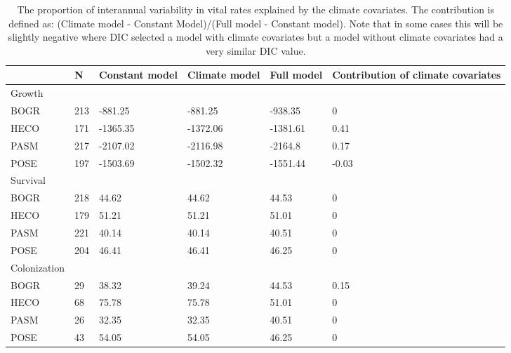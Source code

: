 \documentclass[12pt]{article}
\begin{document}
\begin{table}[ht]
\centering
\caption{The proportion of interannual variability in  vital rates explained by the climate covariates. The contribution is defined as: (Climate model - Constant Model)/(Full model - Constant model). Note that in some cases this will be slightly negative where DIC selected a model with climate covariates but a model without climate covariates had a very similar DIC value.} 
\begin{tabularx}{\textwidth}{lllllX}
  \hline
 & N & Constant model & Climate model & Full model & Contribution of climate covariates \\ 
  \hline
Growth &  &  &  &  &  \\ 
  BOGR & 213 & -881.25 & -881.25 & -938.35 & 0 \\ 
  HECO & 171 & -1365.35 & -1372.06 & -1381.61 & 0.41 \\ 
  PASM & 217 & -2107.02 & -2116.98 & -2164.8 & 0.17 \\ 
  POSE & 197 & -1503.69 & -1502.32 & -1551.44 & -0.03 \\ 
  Survival &  &  &  &  &  \\ 
  BOGR & 218 & 44.62 & 44.62 & 44.53 & 0 \\ 
  HECO & 179 & 51.21 & 51.21 & 51.01 & 0 \\ 
  PASM & 221 & 40.14 & 40.14 & 40.51 & 0 \\ 
  POSE & 204 & 46.41 & 46.41 & 46.25 & 0 \\ 
  Colonization &  &  &  &  &  \\ 
  BOGR & 29 & 38.32 & 39.24 & 44.53 & 0.15 \\ 
  HECO & 68 & 75.78 & 75.78 & 51.01 & 0 \\ 
  PASM & 26 & 32.35 & 32.35 & 40.51 & 0 \\ 
  POSE & 43 & 54.05 & 54.05 & 46.25 & 0 \\ 
   \hline
\end{tabularx}
\end{table}
\end{document}
